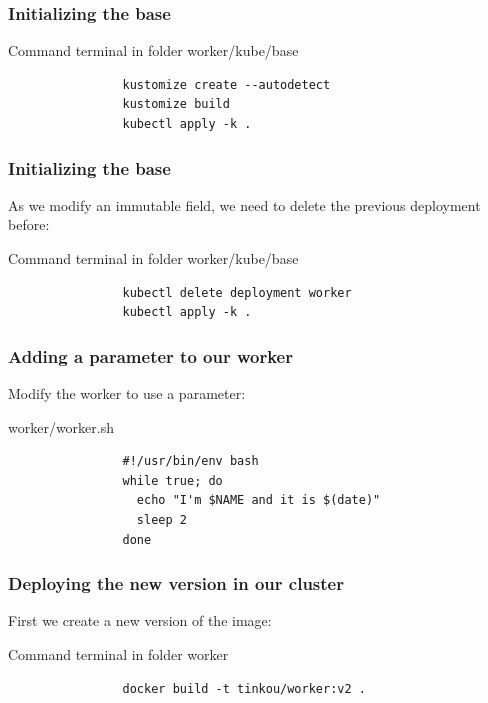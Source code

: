 	\begin{frame}[fragile]
		\frametitle{Initializing the base}
		\begin{block}{Command terminal in folder worker/kube/base}
			\begin{verbatim}
				kustomize create --autodetect
				kustomize build
				kubectl apply -k .
			\end{verbatim}
		\end{block}
	\end{frame}
	
	\begin{frame}[fragile]
		\frametitle{Initializing the base}
		As we modify an immutable field, we need to delete the previous deployment before:
		\begin{block}{Command terminal in folder worker/kube/base}
			\begin{verbatim}
				kubectl delete deployment worker
				kubectl apply -k .
			\end{verbatim}
		\end{block}
	\end{frame}
	
	\begin{frame}[fragile]
		\frametitle{Adding a parameter to our worker}
		
		Modify the worker to use a parameter:
		\begin{block}{worker/worker.sh}
			\begin{verbatim}
				#!/usr/bin/env bash
				while true; do
				  echo "I'm $NAME and it is $(date)"
				  sleep 2
				done
			\end{verbatim}
		\end{block}
	\end{frame}
	
	\begin{frame}[fragile]
		\frametitle{Deploying the new version in our cluster}
		
		First we create a new version of the image:
		\begin{block}{Command terminal in folder worker}
			\begin{verbatim}
				docker build -t tinkou/worker:v2 .
			\end{verbatim}
		\end{block}
	\end{frame}
	
